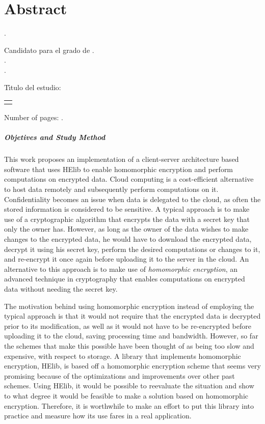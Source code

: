 \chapter{Abstract}

\noindent\autor.

\noindent Candidato para el grado de \grado. \\
\noindent\uanl.\\
\noindent\fime.

\noindent T\'{\i}tulo del estudio: 
\begin{center}
\begin{tabular}{p{13cm}}
	\centering
	\scshape{\large{\titulo}}
\end{tabular}
\end{center} %

\noindent Number of pages: \pageref{LastPage}.

\paragraph{Objetives and Study Method}
This work proposes an implementation of a client-server architecture based software that uses HElib to enable homomorphic encryption and perform computations on encrypted data. Cloud computing is a cost-efficient alternative to host data remotely and subsequently perform computations on it. Confidentiality becomes an issue when data is delegated to the cloud, as often the stored information is considered to be sensitive. A typical approach is to make use of a cryptographic algorithm that encrypts the data with a secret key that only the owner has. However, as long as the owner of the data wishes to make changes to the encrypted data, he would have to download the encrypted data, decrypt it using his secret key, perform the desired computations or changes to it, and re-encrypt it once again before uploading it to the server in the cloud. An alternative to this approach is to make use of \emph{homomorphic encryption}, an advanced technique in cryptography that enables computations on encrypted data without needing the secret key.

The motivation behind using homomorphic encryption instead of employing the typical approach is that it would not require that the encrypted data is decrypted prior to its modification, as well as it would not have to be re-encrypted before uploading it to the cloud, saving processing time and bandwidth. However, so far the schemes that make this possible have been thought of as being too slow and expensive, with respect to storage. A library that implements homomorphic encryption, HElib, is based off a homomorphic encryption scheme that seems very promising because of the optimizations and improvements over other past schemes. Using HElib, it would be possible to reevaluate the situation and show to what degree it would be feasible to make a solution based on homomorphic encryption. Therefore, it is worthwhile to make an effort to put this library into practice and measure how its use fares in a real application.

